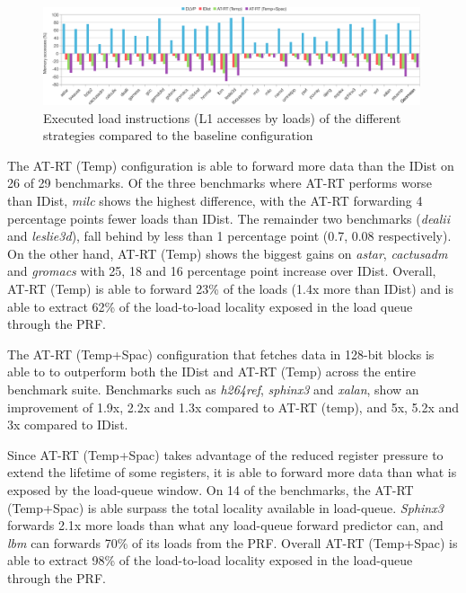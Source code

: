 \documentclass{sig-alternate}
\begin{document}
\begin{figure}[ht]
\centerline{\includegraphics[width=0.99\textwidth]{graphs/MemReduction.pdf}}
\caption{Executed load instructions (L1 accesses by loads) of the different strategies compared to the baseline configuration}
\label{fig:MemReduction}
\end{figure}

The AT-RT (Temp) configuration is able to forward more data than the IDist on 26 of 29 benchmarks. Of the three benchmarks where AT-RT performs worse than IDist, \textit{milc} shows the highest difference, with the AT-RT forwarding 4 percentage points fewer loads than IDist. The remainder two benchmarks (\textit{dealii} and \textit{leslie3d}), fall behind by less than 1 percentage point (0.7, 0.08 respectively). On the other hand, AT-RT (Temp) shows the biggest gains on \textit{astar}, \textit{cactusadm} and \textit{gromacs} with 25, 18 and 16 percentage point increase over IDist. Overall, AT-RT (Temp) is able to forward 23\% of the loads (1.4x more than IDist) and is able to extract 62\% of the load-to-load locality exposed in the load queue through the PRF.

The AT-RT (Temp+Spac) configuration that fetches data in 128-bit blocks is able to to outperform both the IDist and AT-RT (Temp) across the entire benchmark suite. Benchmarks such as \textit{h264ref}, \textit{sphinx3} and \textit{xalan}, show an improvement of 1.9x, 2.2x and 1.3x compared to AT-RT (temp), and 5x, 5.2x and 3x compared to IDist. 

Since AT-RT (Temp+Spac) takes advantage of the reduced register pressure to extend the lifetime of some registers, it is able to forward more data than what is exposed by the load-queue window. On 14 of the benchmarks, the AT-RT (Temp+Spac) is able surpass the total locality available in load-queue. \textit{Sphinx3} forwards 2.1x more loads than what any load-queue forward predictor can, and \textit{lbm} can forwards 70\% of its loads from the PRF. Overall AT-RT (Temp+Spac) is able to extract 98\% of the load-to-load locality exposed in the load-queue through the PRF.

\end{document}
